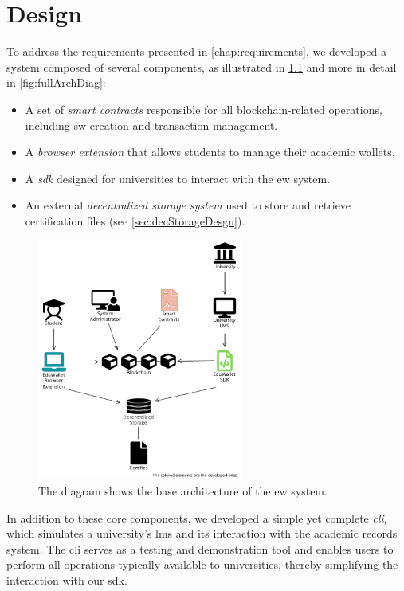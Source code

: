 \chapter{Design}
To address the requirements presented in \cref{chap:requirements}, we developed a system composed of several components, as illustrated in \cref{fig:baseArchDiag}
and more in detail in \cref{fig:fullArchDiag}:
\begin{itemize}
    \item A set of \textit{smart contracts} responsible for all blockchain-related operations, including \acrshort{sw} creation and transaction management.
    \item A \textit{browser extension} that allows students to manage their academic wallets.
    \item A \textit{\acrfull{sdk}} designed for universities to interact with the \acrshort{ew} system.
    \item An external \textit{decentralized storage system} used to store and retrieve certification files (see \cref{sec:decStorageDesgn}).
\end{itemize}
\begin{figure}
  \centering
  \includegraphics[width=0.6\textwidth]{figures/Architecture diagram basic.pdf}
  \caption[System basic architecture diagram]{The diagram shows the base architecture of the \acrlong{ew} system.}
  \label{fig:baseArchDiag}
\end{figure}

In addition to these core components, we developed a simple yet complete \textit{\acrfull{cli}}, which simulates a university's \acrshort{lms} and its interaction with the academic records system. The \acrshort{cli} serves as a testing and demonstration tool and enables users to perform all operations typically available to universities, thereby simplifying the interaction with our \acrshort{sdk}.

